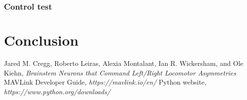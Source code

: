 \documentclass[12pt,a4paper]{article}
\begin{document}
\subsubsection{Control test}\label{sec:control_test}







\section{Conclusion} \label{sec:conc}



\clearpage
\lhead{ }
\begin{thebibliography}{100}
	
	Jared M. Cregg, Roberto Leiras, Alexia Montalant, Ian R. Wickersham, and Ole Kiehn, \textit{Brainstem Neurons that Command Left/Right Locomotor Asymmetries} 
	 MAVLink Developer Guide, \textit{https://mavlink.io/en/}
	 Python website, \textit{https://www.python.org/downloads/}
	

\end{thebibliography}
\end{document}
